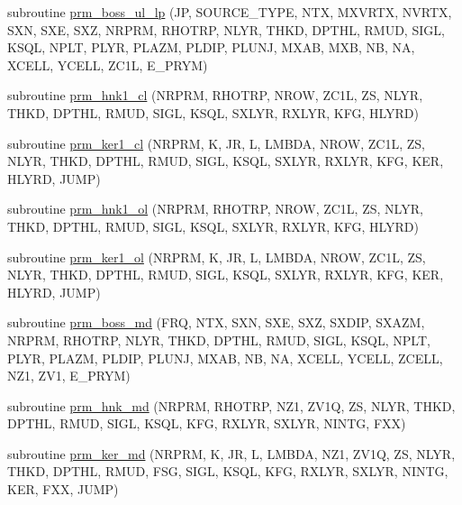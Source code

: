 \begin{DoxyCompactItemize}
\item 
subroutine \hyperlink{Leroi_8f90_a8fe568053ec398fc50ab206827a43d81}{prm\+\_\+boss\+\_\+ul\+\_\+lp} (JP, S\+O\+U\+R\+C\+E\+\_\+\+T\+Y\+PE, N\+TX, M\+X\+V\+R\+TX, N\+V\+R\+TX, S\+XN, S\+XE, S\+XZ, N\+R\+P\+RM, R\+H\+O\+T\+RP, N\+L\+YR, T\+H\+KD, D\+P\+T\+HL, R\+M\+UD, S\+I\+GL, K\+S\+QL, N\+P\+LT, P\+L\+YR, P\+L\+A\+ZM, P\+L\+D\+IP, P\+L\+U\+NJ, M\+X\+AB, M\+XB, NB, NA, X\+C\+E\+LL, Y\+C\+E\+LL, Z\+C1L, E\+\_\+\+P\+R\+YM)
\item 
subroutine \hyperlink{Leroi_8f90_a5285d5a2942c499f6219805b1e689588}{prm\+\_\+hnk1\+\_\+cl} (N\+R\+P\+RM, R\+H\+O\+T\+RP, N\+R\+OW, Z\+C1L, ZS, N\+L\+YR, T\+H\+KD, D\+P\+T\+HL, R\+M\+UD, S\+I\+GL, K\+S\+QL, S\+X\+L\+YR, R\+X\+L\+YR, K\+FG, H\+L\+Y\+RD)
\item 
subroutine \hyperlink{Leroi_8f90_a2ff2214d55840301662aae090b26e04d}{prm\+\_\+ker1\+\_\+cl} (N\+R\+P\+RM, K, JR, L, L\+M\+B\+DA, N\+R\+OW, Z\+C1L, ZS, N\+L\+YR, T\+H\+KD, D\+P\+T\+HL, R\+M\+UD, S\+I\+GL, K\+S\+QL, S\+X\+L\+YR, R\+X\+L\+YR, K\+FG, K\+ER, H\+L\+Y\+RD, J\+U\+MP)
\item 
subroutine \hyperlink{Leroi_8f90_addd341d907a00b743326c01025f01020}{prm\+\_\+hnk1\+\_\+ol} (N\+R\+P\+RM, R\+H\+O\+T\+RP, N\+R\+OW, Z\+C1L, ZS, N\+L\+YR, T\+H\+KD, D\+P\+T\+HL, R\+M\+UD, S\+I\+GL, K\+S\+QL, S\+X\+L\+YR, R\+X\+L\+YR, K\+FG, H\+L\+Y\+RD)
\item 
subroutine \hyperlink{Leroi_8f90_a98390b637677e60abaa0fa6df3249f0b}{prm\+\_\+ker1\+\_\+ol} (N\+R\+P\+RM, K, JR, L, L\+M\+B\+DA, N\+R\+OW, Z\+C1L, ZS, N\+L\+YR, T\+H\+KD, D\+P\+T\+HL, R\+M\+UD, S\+I\+GL, K\+S\+QL, S\+X\+L\+YR, R\+X\+L\+YR, K\+FG, K\+ER, H\+L\+Y\+RD, J\+U\+MP)
\item 
subroutine \hyperlink{Leroi_8f90_ac15aa4c46264754ea7abffbe2ea1926c}{prm\+\_\+boss\+\_\+md} (F\+RQ, N\+TX, S\+XN, S\+XE, S\+XZ, S\+X\+D\+IP, S\+X\+A\+ZM, N\+R\+P\+RM, R\+H\+O\+T\+RP, N\+L\+YR, T\+H\+KD, D\+P\+T\+HL, R\+M\+UD, S\+I\+GL, K\+S\+QL, N\+P\+LT, P\+L\+YR, P\+L\+A\+ZM, P\+L\+D\+IP, P\+L\+U\+NJ, M\+X\+AB, NB, NA, X\+C\+E\+LL, Y\+C\+E\+LL, Z\+C\+E\+LL, N\+Z1, Z\+V1, E\+\_\+\+P\+R\+YM)
\item 
subroutine \hyperlink{Leroi_8f90_a9740ab7613ac873fc595cc92e6d5fbaf}{prm\+\_\+hnk\+\_\+md} (N\+R\+P\+RM, R\+H\+O\+T\+RP, N\+Z1, Z\+V1Q, ZS, N\+L\+YR, T\+H\+KD, D\+P\+T\+HL, R\+M\+UD, S\+I\+GL, K\+S\+QL, K\+FG, R\+X\+L\+YR, S\+X\+L\+YR, N\+I\+N\+TG, F\+XX)
\item 
subroutine \hyperlink{Leroi_8f90_a54994b19439ad9ea5bfc96a902101c44}{prm\+\_\+ker\+\_\+md} (N\+R\+P\+RM, K, JR, L, L\+M\+B\+DA, N\+Z1, Z\+V1Q, ZS, N\+L\+YR, T\+H\+KD, D\+P\+T\+HL, R\+M\+UD, F\+SG, S\+I\+GL, K\+S\+QL, K\+FG, R\+X\+L\+YR, S\+X\+L\+YR, N\+I\+N\+TG, K\+ER, F\+XX, J\+U\+MP)

\end{DoxyCompactItemize}
